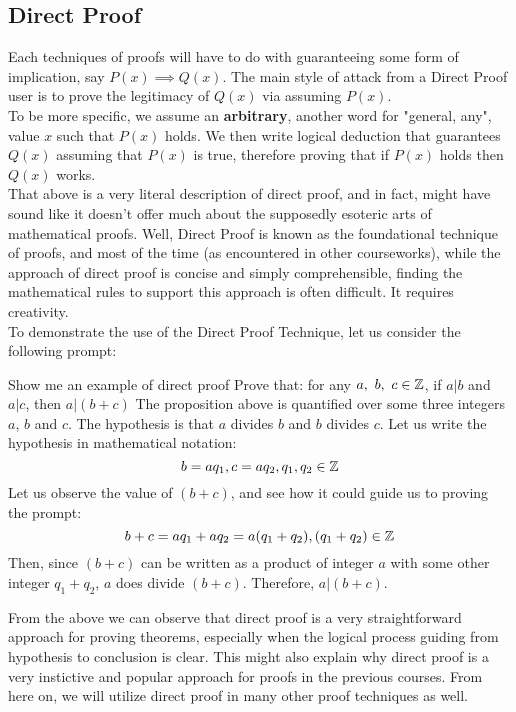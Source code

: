\subsection{Direct Proof}
Each techniques of proofs will have to do with guaranteeing some form of implication, say $P(x) \implies Q(x)$. The main style of attack from a Direct Proof user is to prove the legitimacy of $Q(x)$ via assuming $P(x)$. \\
To be more specific, we assume an \textbf{arbitrary}, another word for "general, any", value $x$ such that $P(x)$ holds. We then write logical deduction that guarantees $Q(x)$ assuming that $P(x)$ is true, therefore proving that if $P(x)$ holds then $Q(x)$ works. \\
That above is a very literal description of direct proof, and in fact, might have sound like it doesn't offer much about the supposedly esoteric arts of mathematical proofs. Well, Direct Proof is known as the foundational technique of proofs, and most of the time (as encountered in other courseworks), while the approach of direct proof is concise and simply comprehensible, finding the mathematical rules to support this approach is often difficult. It requires creativity. \\
To demonstrate the use of the Direct Proof Technique, let us consider the following prompt:
\begin{ln-think}{Show me an example of direct proof}{}
    Prove that: for any $a,\ b,\ c \in \mathbb{Z}$, if $a|b$ and $a|c$, then $a|(b+c)$
    \tcblower
    The proposition above is quantified over some three integers $a$, $b$ and $c$. The hypothesis is that $a$ divides $b$ and $b$ divides $c$. Let us write the hypothesis in mathematical notation:
    \[b = a q_1, c = a q_2, q_1, q_2 \in \mathbb{Z}\]
    Let us observe the value of $(b+c)$, and see how it could guide us to proving the prompt:
    \[b + c = a q_1 + a q_2 = a(q_1 + q_2), (q_1 + q_2) \in \mathbb{Z}\]
    Then, since $(b + c)$ can be written as a product of integer $a$ with some other integer $q_1 + q_2$, $a$ does divide $(b + c)$. Therefore, $a|(b+c)$.
\end{ln-think}
From the above we can observe that direct proof is a very straightforward approach for proving theorems, especially when the logical process guiding from hypothesis to conclusion is clear. This might also explain why direct proof is a very instictive and popular approach for proofs in the previous courses. From here on, we will utilize direct proof in many other proof techniques as well. \\
